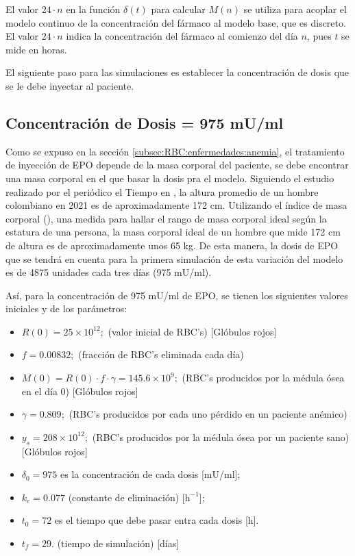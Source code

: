 El valor $24\cdot n$ en la función $\delta(t)$ para calcular $M(n)$ se utiliza para acoplar el modelo continuo de la concentración del fármaco al modelo base, que es discreto. El valor $24 \cdot n$ indica la concentración del fármaco al comienzo del día $n$, pues $t$ se mide en horas.


El siguiente paso para las simulaciones es establecer la concentración de dosis que se le debe inyectar al paciente.

\subsection{Concentración de Dosis  = 975 mU/ml} \label{subsec:variaciones:anemia:mal}

Como se expuso en la sección \ref{subsec:RBC:enfermedades:anemia}, el tratamiento de inyección de EPO depende de la masa corporal del paciente, se debe encontrar una masa corporal en el que basar la dosis pra el modelo. Siguiendo el estudio realizado por el periódico el Tiempo en \cite{elTiempo}, la altura promedio de un hombre colombiano en 2021 es de aproximadamente 172 cm. Utilizando el índice de masa corporal (\cite{IMC}), una medida para hallar el rango de masa corporal ideal según la estatura de una persona, la masa corporal ideal de un hombre que mide 172 cm de altura es de aproximadamente unos 65 kg. De esta manera, la dosis de EPO que se tendrá en cuenta para la primera simulación de esta variación del modelo es de 4875 unidades cada tres días (975 mU/ml).

Así, para la concentración de 975 mU/ml de EPO, se tienen los siguientes valores iniciales y de los parámetros:

\begin{itemize}
    \item $R(0) = 25\times 10^{12};$ (valor inicial de RBC's) [Glóbulos rojos]
    \item $f=0.00832;$ (fracción de RBC's eliminada cada día)
    \item $M(0) = R(0)\cdot f \cdot \gamma = 145.6\times 10^{9};$ (RBC's producidos por la médula ósea en el día 0) [Glóbulos rojos]
    \item $\gamma = 0.809;$ (RBC's producidos por cada uno pérdido en un paciente anémico) 
    \item $y_s = 208\times 10^{12};$ (RBC's producidos por la médula ósea por un paciente sano) [Glóbulos rojos]
    \item $\delta_0=975$ es la concentración de cada dosis [mU/ml];
    \item $k_e=0.077$ (constante de eliminación) [$\textrm{h}^{-1}$];
    \item $t_0=72$ es el tiempo que debe pasar entra cada dosis [h].
    \item $t_f = 29$. (tiempo de simulación) [días]
\end{itemize}

